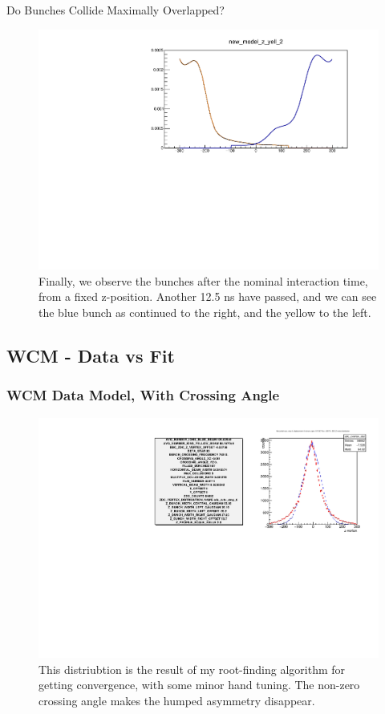 \begin{frame}{Do Bunches Collide Maximally Overlapped?}
\begin{figure}
\begin{center}
\includegraphics[width=0.8\linewidth]{../OverlapTest/figs/359711_time_step_2_bunch_collision.pdf}
\end{center}
\caption{Finally, we observe the bunches after the nominal interaction time,
from a fixed z-position. Another 12.5 ns have passed, and we can see the blue
bunch as continued to the right, and the yellow to the left.}
\label{fig:359711_time_step_2_bunch_collision}
\end{figure}
\end{frame}

\subsection{ WCM - Data vs Fit }
\begin{frame}
\frametitle{WCM Data Model, With Crossing Angle }
\begin{figure}
\begin{center}
\includegraphics[width=\linewidth]{../OverlapTest/figs/359711_model0_angle_vertex.pdf}
\end{center}
\caption{This distriubtion is the result of my root-finding algorithm for
getting convergence, with some minor hand tuning. The non-zero crossing angle
makes the humped asymmetry disappear.}
\label{fig:359711_model0_angle_vertex}
\end{figure}
\end{frame}


